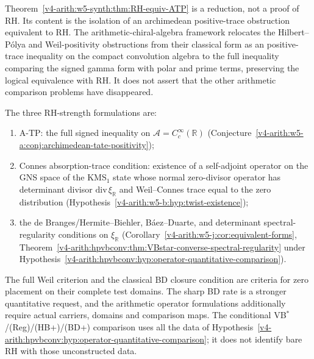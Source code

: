 \begin{remark}[Reduction to A-TP]
\label{v4-arith:w5-synth:rem:honest-reduction}
Theorem~\ref{v4-arith:w5-synth:thm:RH-equiv-ATP} is a reduction, not a
proof of RH. Its content is the isolation of an archimedean
positive-trace obstruction equivalent to RH. The
arithmetic-chiral-algebra framework relocates the Hilbert--P\'{o}lya
and Weil-positivity obstructions from their classical form as an
positive-trace inequality on the compact convolution algebra to the
full inequality comparing the signed gamma form with polar and prime terms, preserving the
logical equivalence with RH.  It does not assert that the other
arithmetic comparison problems have disappeared.
\end{remark}

\begin{remark}
\label{v4-arith:w5-synth:rem:ATP-equivalences}
The three RH-strength formulations are:
\begin{enumerate}
\item A-TP: the full signed inequality on
\(\mathscr A=C_c^\infty(\mathbb R)\)
(Conjecture~\ref{v4-arith:w5-a:conj:archimedean-tate-positivity});
\item Connes absorption-trace condition: existence of a
self-adjoint operator on the GNS space of the KMS\({}_{1}\) state
whose normal zero-divisor operator has determinant divisor
\(\mathrm{div}\,\xi_{\mathbb R}\) and Weil--Connes trace equal to the
zero distribution
(Hypothesis~\ref{v4-arith:w5-b:hyp:twist-existence});
\item the de Branges/Hermite--Biehler, B\'aez--Duarte, and
determinant spectral-regularity conditions on \(\xi_{\mathbb{R}}\)
(Corollary~\ref{v4-arith:w5-j:cor:equivalent-forms},
Theorem~\ref{v4-arith:hpvbconv:thm:VBstar-converse-spectral-regularity} under Hypothesis~\ref{v4-arith:hpvbconv:hyp:operator-quantitative-comparison}).
\end{enumerate}
The full Weil criterion and the classical BD closure condition are
criteria for zero placement on their complete test domains. The
sharp BD rate is a stronger quantitative request, and the
arithmetic operator formulations additionally require actual
carriers, domains and comparison maps. The conditional
VB\(^{*}\)/(Reg)/(HB+)/(BD+) comparison uses all the data of
Hypothesis~\ref{v4-arith:hpvbconv:hyp:operator-quantitative-comparison};
it does not identify bare RH with those unconstructed data.
\end{remark}

